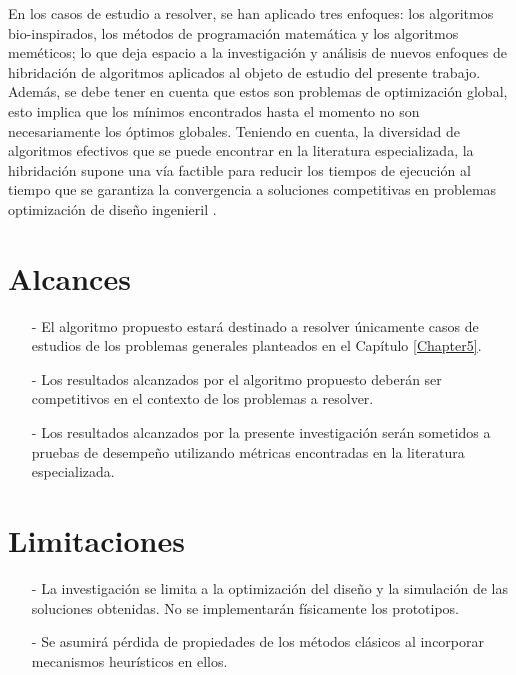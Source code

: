   En los casos de estudio a resolver, se han aplicado tres enfoques: los algoritmos bio-inspirados, los métodos de programación matemática y los algoritmos meméticos; lo que deja espacio a la investigación y análisis de nuevos enfoques de hibridación de algoritmos aplicados al objeto de estudio del presente trabajo. Además, se debe tener en cuenta que estos son problemas de optimización global, esto implica que los mínimos encontrados hasta el momento no son necesariamente los óptimos globales. Teniendo en cuenta, la diversidad de algoritmos efectivos que se puede encontrar en la literatura especializada, la hibridación supone una vía factible para reducir los tiempos de ejecución al tiempo que se garantiza la convergencia a soluciones competitivas en problemas optimización de diseño ingenieril \cite{sacco_metropolis_2008} \cite{koch_hybridization_2009}  \cite{jovanovic_cuckoo_2016}.
  


  \section{Alcances}
  \begin{itemize}
  	\item[-] El algoritmo propuesto estará destinado a resolver únicamente casos de estudios de los problemas generales planteados en el Capítulo \ref{Chapter5}.
  	\item[-] Los resultados alcanzados por el algoritmo propuesto deberán ser competitivos en el contexto de los problemas a resolver.
  	\item [-] Los resultados alcanzados por la presente investigación serán sometidos a pruebas de desempeño utilizando métricas encontradas en la literatura especializada.
  	
  \end{itemize}
  
  \section{Limitaciones}
  \begin{itemize}
  	\item[-] La investigación se limita a la optimización del diseño y la simulación de las soluciones obtenidas. No se implementarán físicamente los prototipos.
  	\item[-] Se asumirá pérdida de propiedades de los métodos clásicos al incorporar mecanismos heurísticos en ellos. 
  	
  \end{itemize}

